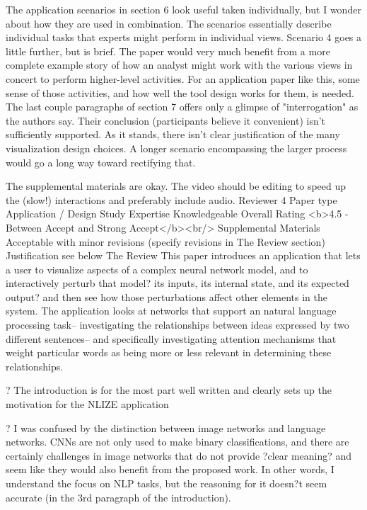 The application scenarios in section 6 look useful taken individually, but I wonder about how they are used in combination. The scenarios essentially describe individual tasks that experts might perform in individual views. Scenario 4 goes a little further, but is brief. The paper would very much benefit from a more complete example story of how an analyst might work with the various views in concert to perform higher-level activities. For an application paper like this, some sense of those activities, and how well the tool design works for them, is needed. The last couple paragraphs of section 7 offers only a glimpse of "interrogation" as the authors say. Their conclusion (participants believe it convenient) isn't sufficiently supported. As it stands, there isn't clear justification of the many visualization design choices. A longer scenario encompassing the larger process would go a long way toward rectifying that.

The supplemental materials are okay. The video should be editing to speed up the (slow!) interactions and preferably include audio.
Reviewer 4
Paper type
Application / Design Study
Expertise
Knowledgeable
Overall Rating
<b>4.5 - Between Accept and Strong Accept</b><br/>
Supplemental Materials
Acceptable with minor revisions (specify revisions in The Review section)
Justification
see below
The Review
This paper introduces an application that lets a user to visualize aspects of a complex neural network model, and to interactively perturb that model? its inputs, its internal state, and its expected output? and then see how those perturbations affect other elements in the system. The application looks at networks that support an natural language processing task-- investigating the relationships between ideas expressed by two different sentences-- and specifically investigating attention mechanisms that weight particular words as being more or less relevant in determining these relationships.

? The introduction is for the most part well written and clearly sets up the motivation for the NLIZE application

? I was confused by the distinction between image networks and language networks. CNNs are not only used to make binary classifications, and there are certainly challenges in image networks that do not provide ?clear meaning? and seem like they would also benefit from the proposed work. In other words, I understand the focus on NLP tasks, but the reasoning for it doesn?t seem accurate (in the 3rd paragraph of the introduction).


